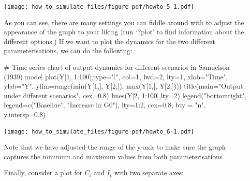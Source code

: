 \documentclass[
  letterpaper,
  DIV=11,
  numbers=noendperiod]{scrreprt}
\newenvironment{Shaded}{\begin{snugshade}}{\end{snugshade}}
\newcommand{\AttributeTok}[1]{\textcolor[rgb]{0.40,0.45,0.13}{#1}}
\newcommand{\CommentTok}[1]{\textcolor[rgb]{0.37,0.37,0.37}{#1}}
\newcommand{\DecValTok}[1]{\textcolor[rgb]{0.68,0.00,0.00}{#1}}
\newcommand{\FloatTok}[1]{\textcolor[rgb]{0.68,0.00,0.00}{#1}}
\newcommand{\FunctionTok}[1]{\textcolor[rgb]{0.28,0.35,0.67}{#1}}
\newcommand{\NormalTok}[1]{\textcolor[rgb]{0.00,0.23,0.31}{#1}}
\newcommand{\SpecialCharTok}[1]{\textcolor[rgb]{0.37,0.37,0.37}{#1}}
\newcommand{\StringTok}[1]{\textcolor[rgb]{0.13,0.47,0.30}{#1}}
\begin{document}
\texttt{[image: how\_to\_simulate\_files/figure-pdf/howto\_5-1.pdf]}

As you can see, there are many settings you can fiddle around with to
adjust the appearance of the graph to your liking (run `?plot' to find
information about the different options.) If we want to plot the
dynamics for the two different parameterisations, we can do the
following:

\begin{Shaded}
\begin{Highlighting}[]
\CommentTok{\# Time series chart of output dynamics for different scenarios in Samuelson (1939) model}
\FunctionTok{plot}\NormalTok{(Y[}\DecValTok{1}\NormalTok{, }\DecValTok{1}\SpecialCharTok{:}\DecValTok{100}\NormalTok{],}\AttributeTok{type=}\StringTok{"l"}\NormalTok{, }\AttributeTok{col=}\DecValTok{1}\NormalTok{, }\AttributeTok{lwd=}\DecValTok{2}\NormalTok{, }\AttributeTok{lty=}\DecValTok{1}\NormalTok{, }\AttributeTok{xlab=}\StringTok{"Time"}\NormalTok{, }\AttributeTok{ylab=}\StringTok{"Y"}\NormalTok{, }\AttributeTok{ylim=}\FunctionTok{range}\NormalTok{(}\FunctionTok{min}\NormalTok{(Y[}\DecValTok{1}\NormalTok{,], Y[}\DecValTok{2}\NormalTok{,]), }\FunctionTok{max}\NormalTok{(Y[}\DecValTok{1}\NormalTok{,], Y[}\DecValTok{2}\NormalTok{,]))) }
\FunctionTok{title}\NormalTok{(}\AttributeTok{main=}\StringTok{"Output under different scenarios"}\NormalTok{, }\AttributeTok{cex=}\FloatTok{0.8}\NormalTok{)}
\FunctionTok{lines}\NormalTok{(Y[}\DecValTok{2}\NormalTok{, }\DecValTok{1}\SpecialCharTok{:}\DecValTok{100}\NormalTok{],}\AttributeTok{lty=}\DecValTok{2}\NormalTok{)}
\FunctionTok{legend}\NormalTok{(}\StringTok{"bottomright"}\NormalTok{, }\AttributeTok{legend=}\FunctionTok{c}\NormalTok{(}\StringTok{"Baseline"}\NormalTok{, }\StringTok{"Increase in G0"}\NormalTok{),}
       \AttributeTok{lty=}\DecValTok{1}\SpecialCharTok{:}\DecValTok{2}\NormalTok{, }\AttributeTok{cex=}\FloatTok{0.8}\NormalTok{, }\AttributeTok{bty =} \StringTok{"n"}\NormalTok{, }\AttributeTok{y.intersp=}\FloatTok{0.8}\NormalTok{)}
\end{Highlighting}
\end{Shaded}

\texttt{[image: how\_to\_simulate\_files/figure-pdf/howto\_6-1.pdf]}

Note that we have adjusted the range of the y-axis to make sure the
graph captures the minimum and maximum values from both
parameterisations.

Finally, consider a plot for \(C_t\) and \(I_t\) with two separate axes:
\end{document}
